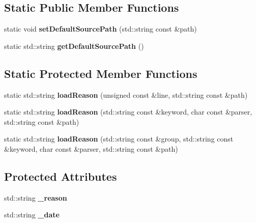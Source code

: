 \subsection*{Static Public Member Functions}
\begin{DoxyCompactItemize}
\item 
\hypertarget{classstb_1_1Error_ae1fb982d1e8142949afb5a504887a603}{static void {\bfseries set\+Default\+Source\+Path} (std\+::string const \&path)}\label{classstb_1_1Error_ae1fb982d1e8142949afb5a504887a603}

\item 
\hypertarget{classstb_1_1Error_ab789142a97ea96ba4c6c465ba126dabf}{static std\+::string {\bfseries get\+Default\+Source\+Path} ()}\label{classstb_1_1Error_ab789142a97ea96ba4c6c465ba126dabf}

\end{DoxyCompactItemize}
\subsection*{Static Protected Member Functions}
\begin{DoxyCompactItemize}
\item 
\hypertarget{classstb_1_1Error_a4ad1d6e526639c25ec5366738f89e71c}{static std\+::string {\bfseries load\+Reason} (unsigned const \&line, std\+::string const \&path)}\label{classstb_1_1Error_a4ad1d6e526639c25ec5366738f89e71c}

\item 
\hypertarget{classstb_1_1Error_a6c82cee5e945d8ff558174b73cf887c4}{static std\+::string {\bfseries load\+Reason} (std\+::string const \&keyword, char const \&parser, std\+::string const \&path)}\label{classstb_1_1Error_a6c82cee5e945d8ff558174b73cf887c4}

\item 
\hypertarget{classstb_1_1Error_a2d42bfcb8d2d6e113ea5c2feeeaa053f}{static std\+::string {\bfseries load\+Reason} (std\+::string const \&group, std\+::string const \&keyword, char const \&parser, std\+::string const \&path)}\label{classstb_1_1Error_a2d42bfcb8d2d6e113ea5c2feeeaa053f}

\end{DoxyCompactItemize}
\subsection*{Protected Attributes}
\begin{DoxyCompactItemize}
\item 
\hypertarget{classstb_1_1Error_a0a7a01e9d66691c0aae09e616baac1a5}{std\+::string {\bfseries \+\_\+reason}}\label{classstb_1_1Error_a0a7a01e9d66691c0aae09e616baac1a5}

\item 
\hypertarget{classstb_1_1Error_acee5779af314f3bccf62877a3112e050}{std\+::string {\bfseries \+\_\+date}}\label{classstb_1_1Error_acee5779af314f3bccf62877a3112e050}

\end{DoxyCompactItemize}
